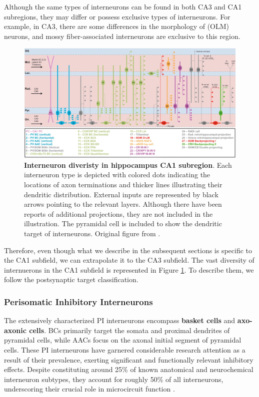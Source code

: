 \documentclass[../main.tex]{subfiles}
\begin{document}
Although the same types of interneurons can be found in both CA3 and CA1 subregions, they may differ or possess exclusive types of interneurons.
For example, in CA3, there are some differences in the morphology of  (OLM) neurons, and mossy fiber-associated interneurons are exclusive to this region.
\begin{figure}[!htb]
    \centering
    \includegraphics[width=\textwidth]{chapter4/figures/interneuron-diversity-CA1.jpg}
    \caption{\textbf{Interneuron diveristy in hippocampus CA1 subregion}.
    Each interneuron type is depicted with colored dots indicating the locations of axon terminations and thicker lines illustrating their dendritic distribution.
    External inputs are represented by black arrows pointing to the relevant layers. Although there have been reports of additional projections, they are not included in the illustration.
    The pyramidal cell is included to show the dendritic target of interneurons.
     Original figure from \citep{tzilivaki_hippocampal_2023}.}
    \label{fig:interneuron-diversity}
\end{figure}
Therefore, even though what we describe in the subsequent sections is specific to the CA1 subfield, we can extrapolate it to the CA3 subfield.
The vast diversity of internuerons in the CA1 subfield is represented in Figure \ref{fig:interneuron-diversity}.
To describe them, we follow the postsynaptic target classification.

\subsubsection{Perisomatic Inhibitory Interneurons}
The extensively characterized PI interneurons encompass \textbf{basket cells} and \textbf{axo-axonic cells}.
BCs primarily target the somata and proximal dendrites of pyramidal cells, while AACs focus on the axonal initial segment of pyramidal cells.
These PI interneurons have garnered considerable research attention as a result of their prevalence, exerting significant and functionally relevant inhibitory effects. 
Despite constituting around 25\% of known anatomical and neurochemical interneuron subtypes, they account for roughly 50\% of all interneurons, underscoring their crucial role in microcircuit function \citep{booker_morphological_2018}.
\end{document}
